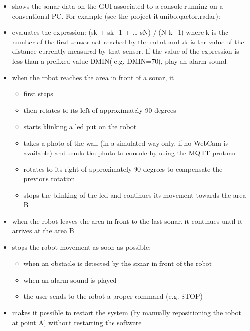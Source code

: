 \documentclass[a4paper]{article}
\begin{document}
\begin{itemize}
	\item shows the sonar data on the GUI associated to a console running on a conventional PC. For example (see the project it.unibo.qactor.radar):
	\item evaluates the expression: (sk + sk+1 + ... sN) / (N-k+1)
	where k is the number of the first sensor not reached by the robot and sk is the value of the distance currently measured by that sensor. If the value of the expression is less than a prefixed value DMIN( e.g. DMIN=70), play an alarm sound.
	\item when the robot reaches the area in front of a sonar, it
	\begin{itemize}
		\item first stops
		\item then rotates to its left of approximately 90 degrees
		\item starts blinking a led put on the robot
		\item takes a photo of the wall (in a simulated way only, if no WebCam is available) and sends the photo to console by using the MQTT protocol
		\item rotates to its right of approximately 90 degrees to compensate the previous rotation
		\item stops the blinking of the led and continues its movement towards the area B
	\end{itemize}
	\item when the robot leaves the area in front to the last sonar, it continues until it arrives at the area B
	\item stops the robot movement as soon as possible:
	\begin{itemize}
		\item when an obstacle is detected by the sonar in front of the robot
		\item when an alarm sound is played
		\item the user sends to the robot a proper command (e.g. STOP)
	\end{itemize}
	\item makes it possible to restart the system (by manually repositioning the robot at point A) without restarting the software
\end{itemize}


\end{document}
